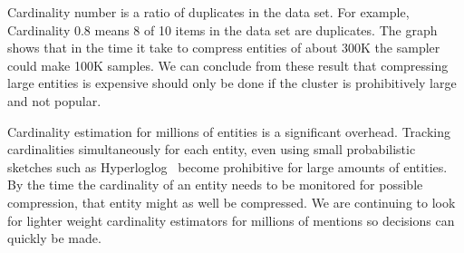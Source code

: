 Cardinality number is a ratio of duplicates in the data set.
For example, Cardinality 0.8 means 8 of 10 items in the data set are duplicates.
The graph shows that in the time it take to compress entities of about 300K
the sampler could make 100K samples.
We can conclude from these result that compressing large entities is expensive
should only be done if the cluster is prohibitively large and not popular.

Cardinality estimation for millions of entities is a significant overhead.
Tracking cardinalities simultaneously for each entity, even using small probabilistic sketches such as Hyperloglog~\cite{flajolet2008hyperloglog}
become prohibitive for large amounts of entities.
By the time the cardinality of an entity needs to be monitored for possible compression, that entity might as well be compressed.
We are continuing to look for lighter weight cardinality estimators for millions of mentions so decisions can quickly be made.



